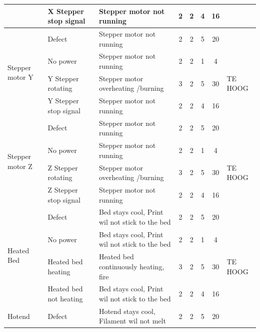 \documentclass{article}
\begin{document}
\begin{landscape}
\begin{longtable}{|l|l|l|c|c|c|c|l|}
                                            & X Stepper stop signal & Stepper motor not running             & 2 & 2 & 4 & 16 & \\ 
                                            \hline 
        \multirow{4}{*}{Stepper motor Y}    & Defect                & Stepper motor not running             & 2 & 2 & 5 & 20 & \\
                                            & No power              & Stepper motor not running             & 2 & 2 & 1 &  4 & \\
                                            & Y Stepper rotating    & Stepper motor overheating /burning    & 3 & 2 & 5 & 30 & TE HOOG \\
                                            & Y Stepper stop signal & Stepper motor not running             & 2 & 2 & 4 & 16 & \\ 
                                            \hline
        \multirow{4}{*}{Stepper motor Z}    & Defect                & Stepper motor not running             & 2 & 2 & 5 & 20 & \\
                                            & No power              & Stepper motor not running             & 2 & 2 & 1 &  4 & \\
                                            & Z Stepper rotating    & Stepper motor overheating /burning    & 3 & 2 & 5 & 30 & TE HOOG \\
                                            & Z Stepper stop signal & Stepper motor not running             & 2 & 2 & 4 & 16 & \\ 
                                            \hline 
        \multirow{4}{*}{Heated Bed}         & Defect                    & Bed stays cool, Print wil not stick to the bed    & 2 & 2 & 5 & 20 & \\
                                            & No power                  & Bed stays cool, Print wil not stick to the bed    & 2 & 2 & 1 &  4 & \\
                                            & Heated bed heating        & Heated bed continuously heating, fire             & 3 & 2 & 5 & 30 & TE HOOG \\
                                            & Heated bed not heating    & Bed stays cool, Print wil not stick to the bed    & 2 & 2 & 4 & 16 & \\ 
                                            \hline 
        \multirow{4}{*}{Hotend}             & Defect                    & Hotend stays cool, Filament wil not melt          & 2 & 2 & 5 & 20 & \\

\end{longtable}
\end{landscape}
\end{document}
